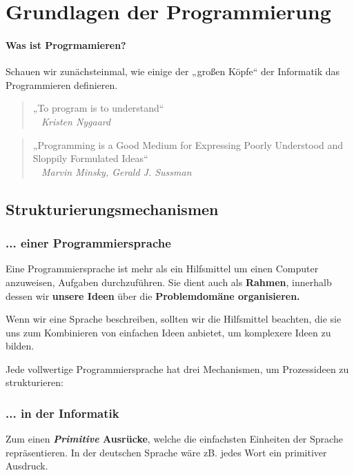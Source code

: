 
\chapter{Grundlagen der Programmierung}
\label{c:grundlagen}
\setcounter{page}{1}
\subsubsection{Was ist Progrmamieren?}

Schauen wir zunächsteinmal, wie einige der „großen Köpfe“ der
Informatik das Programmieren definieren.

\begin{quote}
	„To program is to understand“ \\
	\textit{~ Kristen Nygaard}
\end{quote}

\begin{quote}
	„Programming is a Good Medium for Expressing Poorly
	Understood and Sloppily Formulated Ideas“\\
	\textit{~ Marvin Minsky, Gerald J. Sussman}
\end{quote}

\section{Strukturierungsmechanismen}

\subsection{... einer Programmiersprache}

Eine Programmiersprache ist mehr als ein Hilfsmittel um einen Computer anzuweisen, Aufgaben durchzuführen.
Sie dient auch als \textbf{Rahmen}, innerhalb dessen wir \textbf{unsere Ideen} über die \textbf{Problemdomäne organisieren.}

Wenn wir eine Sprache beschreiben, sollten wir die Hilfsmittel beachten, die sie uns zum Kombinieren von einfachen Ideen anbietet, um komplexere Ideen zu bilden.

Jede vollwertige Programmiersprache hat drei Mechanismen, um Prozessideen zu strukturieren:

\subsection{... in der Informatik}

Zum einen \textbf{\textit{Primitive} Ausrücke}, welche die einfachsten Einheiten der Sprache repräsentieren. In der deutschen Sprache wäre zB. jedes Wort ein primitiver Ausdruck.


